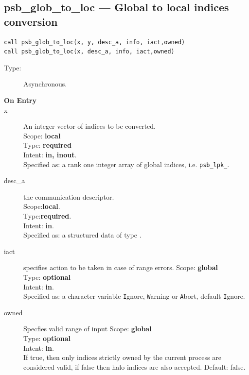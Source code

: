 %
%
\clearpage\subsection{psb\_glob\_to\_loc --- Global to local indices
  conversion}

\begin{verbatim}
call psb_glob_to_loc(x, y, desc_a, info, iact,owned)
call psb_glob_to_loc(x, desc_a, info, iact,owned)
\end{verbatim}

\begin{description}
\item[Type:] Asynchronous.
\item[\bf On Entry]
\item[x] An integer vector of indices to be converted.\\
Scope: {\bf local} \\
Type: {\bf required}\\
Intent: {\bf in, inout}.\\
Specified as: a rank one integer array of global indices, i.e. \verb|psb_lpk_|.\\
\item[desc\_a] the communication descriptor.\\
Scope:{\bf local}.\\
Type:{\bf required}.\\
Intent: {\bf in}.\\
Specified as: a structured data of type \descdata.
\item[iact] specifies action to be taken in case of range errors. 
Scope: {\bf global} \\
Type: {\bf optional}\\
Intent: {\bf in}.\\
Specified as: a character variable  \verb|I|gnore, \verb|W|arning or
\verb|A|bort, default \verb|I|gnore.
\item[owned] Specfies valid range of input 
Scope: {\bf global} \\
Type: {\bf optional}\\
Intent: {\bf in}.\\
If true, then only indices strictly owned by the current process are
considered valid, if false then halo indices are also
accepted. Default: false. 
\end{description}

